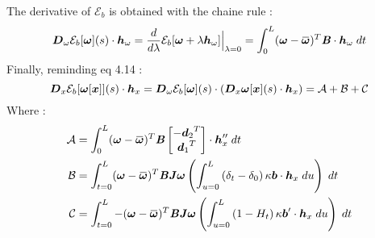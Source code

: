 The derivative of $\mathcal{E}_b$ is obtained with the chaine rule :
\begin{equation}
	\pdiffof{\omega}{\mathcal{E}_b[\vect{\omega}]}{s}{\vect{h}_\omega}
		= \frac{d}{d\lambda} \mathcal{E}_b[\vect{\omega} + \lambda \vect{h}_\omega]\Bigr|_{\lambda = 0}
		= \int_{0}^{L} (\vect{\omega} - \overbar{\vect{\omega}})^T \mat{B} \cdot \vect{h}_\omega \;dt
\end{equation}
Finally, reminding eq 4.14 :
\begin{equation}
	\boldsymbol{D}_x\mathcal{E}_b[\boldsymbol{\omega}[\boldsymbol{x}]](s)\cdot\boldsymbol{h}_x
	= \boldsymbol{D}_\omega\mathcal{E}_b[\boldsymbol{\omega}](s)\cdot(\boldsymbol{D}_x\boldsymbol{\omega}[\boldsymbol{x}](s)\cdot\boldsymbol{h}_x)
	= \mathcal{A} +\mathcal{B}+\mathcal{C}
\end{equation}
Where :
\begin{equation}
	\begin{aligned}
	\mathcal{A} &= \int_{0}^{L} (\vect{\omega} - \overbar{\vect{\omega}})^T \mat{B} 
	\begin{bmatrix}
		-{\vect{d}_2}^T\\
		{\vect{d}_1}^T\\
	\end{bmatrix}\cdot \vect{h}_x'' \;dt \\
	\mathcal{B} &=
	\int_{t=0}^{L} (\vect{\omega} - \overbar{\vect{\omega}})^T \mat{B}\mat{J}\vect{\omega}
	\left(\int_{u=0}^L \left(\delta_t-\delta_0\right)\kappa\vect{b}\cdot  \vect{h}_x \;du\right)
	\;dt\\
	\mathcal{C} &=
	\int_{t=0}^{L} -(\vect{\omega} - \overbar{\vect{\omega}})^T \mat{B}\mat{J}\vect{\omega}
	\left(\int_{u=0}^L \left(1-H_t\right)\kappa\vect{b}'\cdot  \vect{h}_x \;du\right)
	\;dt
	\end{aligned}
\end{equation}

